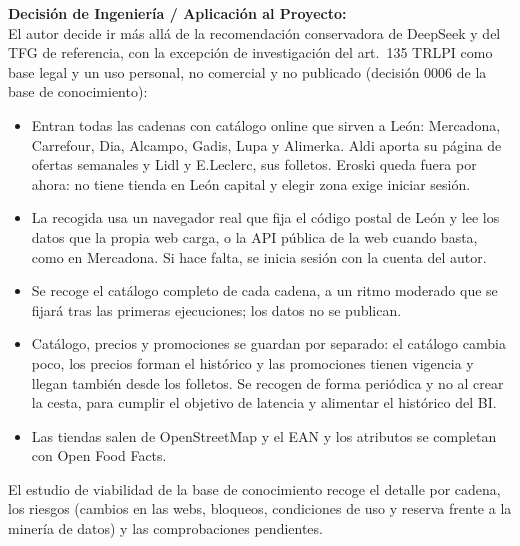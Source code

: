 \textbf{Decisión de Ingeniería / Aplicación al Proyecto:} \\
El autor decide ir más allá de la recomendación conservadora de DeepSeek y del TFG de referencia, con la excepción de investigación del art.~135 TRLPI como base legal y un uso personal, no comercial y no publicado (decisión 0006 de la base de conocimiento):

\begin{itemize}
	\item Entran todas las cadenas con catálogo online que sirven a León: Mercadona, Carrefour, Dia, Alcampo, Gadis, Lupa y Alimerka. Aldi aporta su página de ofertas semanales y Lidl y E.Leclerc, sus folletos. Eroski queda fuera por ahora: no tiene tienda en León capital y elegir zona exige iniciar sesión.
	\item La recogida usa un navegador real que fija el código postal de León y lee los datos que la propia web carga, o la API pública de la web cuando basta, como en Mercadona. Si hace falta, se inicia sesión con la cuenta del autor.
	\item Se recoge el catálogo completo de cada cadena, a un ritmo moderado que se fijará tras las primeras ejecuciones; los datos no se publican.
	\item Catálogo, precios y promociones se guardan por separado: el catálogo cambia poco, los precios forman el histórico y las promociones tienen vigencia y llegan también desde los folletos. Se recogen de forma periódica y no al crear la cesta, para cumplir el objetivo de latencia y alimentar el histórico del BI.
	\item Las tiendas salen de OpenStreetMap y el EAN y los atributos se completan con Open Food Facts.
\end{itemize}

El estudio de viabilidad de la base de conocimiento recoge el detalle por cadena, los riesgos (cambios en las webs, bloqueos, condiciones de uso y reserva frente a la minería de datos) y las comprobaciones pendientes.

\vspace{0.5cm}
